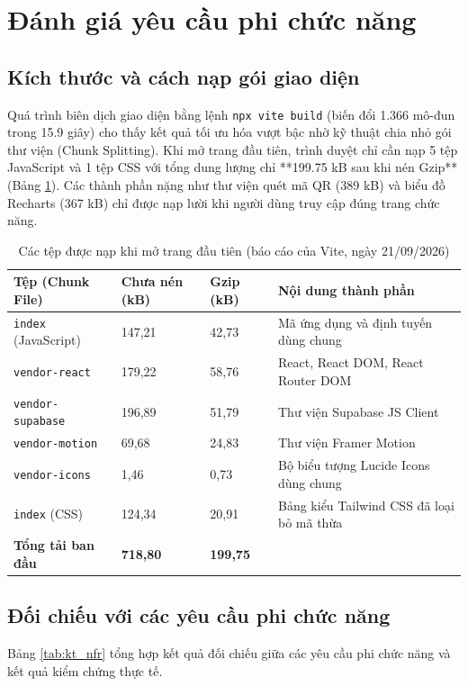 \section{Đánh giá yêu cầu phi chức năng}
\label{sec:kt_phichucnang}

\subsection{Kích thước và cách nạp gói giao diện}
\label{ssec:kt_bundle}
Quá trình biên dịch giao diện bằng lệnh \texttt{npx vite build} (biến đổi 1.366 mô-đun trong 15.9 giây) cho thấy kết quả tối ưu hóa vượt bậc nhờ kỹ thuật chia nhỏ gói thư viện (Chunk Splitting). Khi mở trang đầu tiên, trình duyệt chỉ cần nạp 5 tệp JavaScript và 1 tệp CSS với tổng dung lượng chỉ **199.75 kB sau khi nén Gzip** (Bảng \ref{tab:kt_bundle}). Các thành phần nặng như thư viện quét mã QR (389 kB) và biểu đồ Recharts (367 kB) chỉ được nạp lười khi người dùng truy cập đúng trang chức năng.

\begin{table}[H]
\centering
\caption{Các tệp được nạp khi mở trang đầu tiên (báo cáo của Vite, ngày 21/09/2026)}
\label{tab:kt_bundle}
\small
\renewcommand{\arraystretch}{1.2}
\begin{tabular}{|p{4.6cm}|p{2.4cm}|p{2.2cm}|p{4.2cm}|}
\hline
\textbf{Tệp (Chunk File)} & \textbf{Chưa nén (kB)} & \textbf{Gzip (kB)} & \textbf{Nội dung thành phần} \\
\hline
\texttt{index} (JavaScript) & 147,21 & 42,73 & Mã ứng dụng và định tuyến dùng chung \\
\hline
\texttt{vendor-react} & 179,22 & 58,76 & React, React DOM, React Router DOM \\
\hline
\texttt{vendor-supabase} & 196,89 & 51,79 & Thư viện Supabase JS Client \\
\hline
\texttt{vendor-motion} & 69,68 & 24,83 & Thư viện Framer Motion \\
\hline
\texttt{vendor-icons} & 1,46 & 0,73 & Bộ biểu tượng Lucide Icons dùng chung \\
\hline
\texttt{index} (CSS) & 124,34 & 20,91 & Bảng kiểu Tailwind CSS đã loại bỏ mã thừa \\
\hline
\textbf{Tổng tải ban đầu} & \textbf{718,80} & \textbf{199,75} & \\
\hline
\end{tabular}
\end{table}

\subsection{Đối chiếu với các yêu cầu phi chức năng}
\label{ssec:kt_nfr}
Bảng \ref{tab:kt_nfr} tổng hợp kết quả đối chiếu giữa các yêu cầu phi chức năng và kết quả kiểm chứng thực tế.

